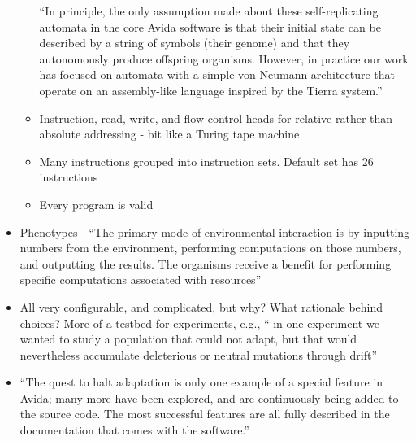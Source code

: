\begin{itemize}
\begin{itemize}
		``In principle, the only assumption made about these
		self-replicating automata in the core Avida software is that their
		initial state can be described by a string of symbols (their genome)
		and that they autonomously produce offspring organisms. However, in
		practice our work has focused on automata with a simple von Neumann
		architecture that operate on an assembly-like language inspired by
		the Tierra system.''
		
		\item
		
		Instruction, read, write, and flow control heads for relative rather
		than absolute addressing - bit like a Turing tape machine
		
		\item
		
		Many instructions grouped into instruction sets. Default set has 26
		instructions
		
		\item
		
		Every program is valid
		
	\end{itemize}
	\item
	
	Phenotypes - ``The primary mode of environmental interaction is by
	inputting numbers from the environment, performing computations on
	those numbers, and outputting the results. The organisms receive a
	benefit for performing specific computations associated with
	resources''
	
	\item
	
	All very configurable, and complicated, but why? What rationale behind
	choices? More of a testbed for experiments, e.g., `` in one experiment
	we wanted to study a population that could not adapt, but that would
	nevertheless accumulate deleterious or neutral mutations through
	drift''
	
	\item
	
	``The quest to halt adaptation is only one example of a special
	feature in Avida; many more have been explored, and are continuously
	being added to the source code. The most successful features are all
	fully described in the documentation that comes with the software.''
	
\end{itemize}

\autocite{Lenski2003}

